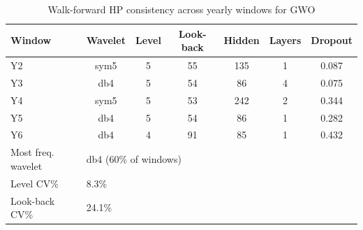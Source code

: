 \begin{table}[htbp]
\centering
\caption{Walk-forward HP consistency across yearly windows for GWO}
\label{tab:wf_hp_gwo}
\begin{tabular}{lcccccc}
\hline
Window & Wavelet & Level & Look-back & Hidden & Layers & Dropout \\
\hline
Y2   & sym5   &  5 &  55 &  135 &  1 & 0.087 \\
Y3   & db4    &  5 &  54 &   86 &  4 & 0.075 \\
Y4   & sym5   &  5 &  53 &  242 &  2 & 0.344 \\
Y5   & db4    &  5 &  54 &   86 &  1 & 0.282 \\
Y6   & db4    &  4 &  91 &   85 &  1 & 0.432 \\
\hline
Most freq. wavelet & \multicolumn{6}{l}{db4 (60\% of windows)} \\
Level CV\% & \multicolumn{6}{l}{8.3\%} \\
Look-back CV\% & \multicolumn{6}{l}{24.1\%} \\
\hline
\end{tabular}
\end{table}